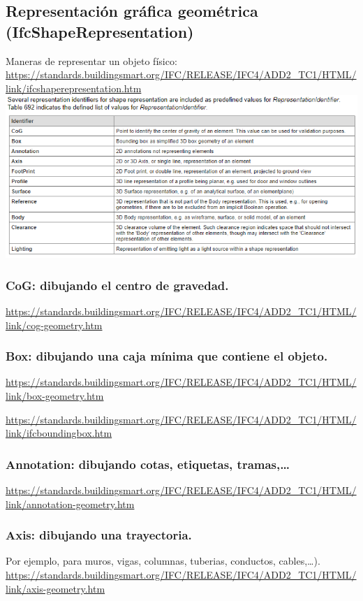 \documentclass[spanish,12pt,a4paper,final,oneside]{book}
\begin{document}
\subsection{Representación gráfica geométrica (IfcShapeRepresentation)}
Maneras de representar un objeto físico:
\\ \url{https://standards.buildingsmart.org/IFC/RELEASE/IFC4/ADD2_TC1/HTML/link/ifcshaperepresentation.htm}
\\ \includegraphics[width=\textwidth]{RepresentationIdentifier}


\subsubsection{CoG: dibujando el centro de gravedad.}
\url{https://standards.buildingsmart.org/IFC/RELEASE/IFC4/ADD2_TC1/HTML/link/cog-geometry.htm}

\subsubsection{Box: dibujando una caja mínima que contiene el objeto.}
\url{https://standards.buildingsmart.org/IFC/RELEASE/IFC4/ADD2_TC1/HTML/link/box-geometry.htm}

\url{https://standards.buildingsmart.org/IFC/RELEASE/IFC4/ADD2_TC1/HTML/link/ifcboundingbox.htm}

\subsubsection{Annotation: dibujando cotas, etiquetas, tramas,\ldots}
\url{https://standards.buildingsmart.org/IFC/RELEASE/IFC4/ADD2_TC1/HTML/link/annotation-geometry.htm}

\subsubsection{Axis: dibujando una trayectoria.}
Por ejemplo, para muros, vigas, columnas, tuberias, conductos, cables,\ldots).
\\ \url{https://standards.buildingsmart.org/IFC/RELEASE/IFC4/ADD2_TC1/HTML/link/axis-geometry.htm}
\end{document}

